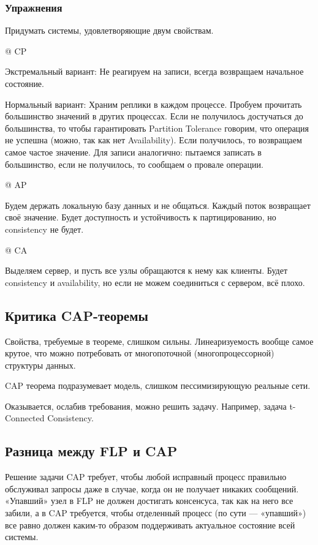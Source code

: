 \subsubsection{Упражнения}
Придумать системы, удовлетворяющие двум свойствам.
\begin{el}[ul]
@ CP

Экстремальный вариант: Не реагируем на записи, всегда возвращаем начальное состояние.

Нормальный вариант: Храним реплики в каждом процессе. Пробуем прочитать большинство значений в других процессах. Если не получилось достучаться до большинства, то чтобы гарантировать Partition Tolerance говорим, что операция не успешна (можно, так как нет Availability). Если получилось, то возвращаем самое частое значение. Для записи аналогично: пытаемся записать в большинство, если не получилось, то сообщаем о провале операции.

@ AP 

Будем держать локальную базу данных и не общаться. Каждый поток возвращает своё значение. Будет доступность и устойчивость к партицированию, но consistency не будет.

@ CA

Выделяем сервер, и пусть все узлы обращаются к нему как клиенты. Будет consistency и availability, но если не можем соединиться с сервером, всё плохо.
\end{el}

\subsection{Критика CAP-теоремы}
Свойства, требуемые в теореме, слишком сильны. Линеаризуемость вообще самое крутое, что можно потребовать от многопоточной (многопроцессорной) структуры данных.

CAP теорема подразумевает модель, слишком пессимизирующую реальные сети.

Оказывается, ослабив требования, можно решить задачу. Например, задача t-Connected Consistency.

\subsection{Разница между FLP и CAP}
Решение задачи CAP требует, чтобы любой исправный процесс правильно обслуживал запросы даже в случае, когда он не получает никаких сообщений. «Упавший» узел в FLP не должен достигать консенсуса, так как на него все забили, а в CAP требуется, чтобы отделенный процесс (по сути — «упавший») все равно должен каким-то образом поддерживать актуальное состояние всей системы.

